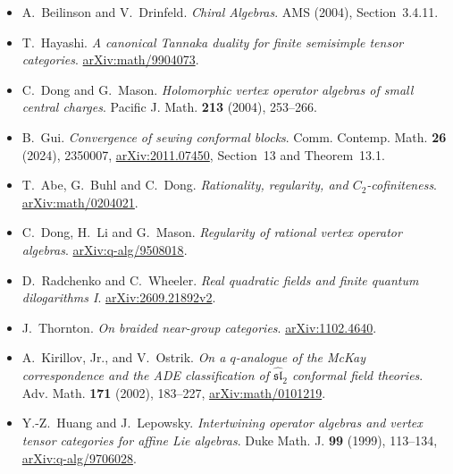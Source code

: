 \begin{itemize}

\item A.~Beilinson and V.~Drinfeld. \emph{Chiral Algebras}. AMS (2004), Section~3.4.11.

\item T.~Hayashi. \emph{A canonical Tannaka duality for finite semisimple tensor categories}. \href{https://arxiv.org/abs/math/9904073}{arXiv:math/9904073}.

\item C.~Dong and G.~Mason. \emph{Holomorphic vertex operator algebras of small central charges}. Pacific J. Math. \textbf{213} (2004), 253--266.

\item B.~Gui. \emph{Convergence of sewing conformal blocks}. Comm. Contemp. Math. \textbf{26} (2024), 2350007, \href{https://arxiv.org/abs/2011.07450}{arXiv:2011.07450}, Section~13 and Theorem~13.1.

\item T.~Abe, G.~Buhl and C.~Dong. \emph{Rationality, regularity, and \(C_2\)-cofiniteness}. \href{https://arxiv.org/abs/math/0204021}{arXiv:math/0204021}.

\item C.~Dong, H.~Li and G.~Mason. \emph{Regularity of rational vertex operator algebras}. \href{https://arxiv.org/abs/q-alg/9508018}{arXiv:q-alg/9508018}.

\item D.~Radchenko and C.~Wheeler. \emph{Real quadratic fields and finite quantum dilogarithms I}. \href{https://arxiv.org/abs/2609.21892v2}{arXiv:2609.21892v2}.

\item J.~Thornton. \emph{On braided near-group categories}. \href{https://arxiv.org/abs/1102.4640}{arXiv:1102.4640}.

\item A.~Kirillov, Jr., and V.~Ostrik. \emph{On a \(q\)-analogue of the McKay correspondence and the ADE classification of \(\widehat{\mathfrak{sl}}_2\) conformal field theories}. Adv. Math. \textbf{171} (2002), 183--227, \href{https://arxiv.org/abs/math/0101219}{arXiv:math/0101219}.

\item Y.-Z.~Huang and J.~Lepowsky. \emph{Intertwining operator algebras and vertex tensor categories for affine Lie algebras}. Duke Math. J. \textbf{99} (1999), 113--134, \href{https://arxiv.org/abs/q-alg/9706028}{arXiv:q-alg/9706028}.


\end{itemize}

